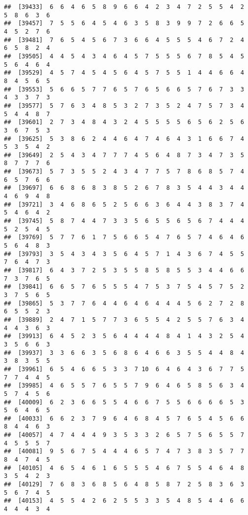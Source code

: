 \documentclass[
]{book}
\begin{document}
\begin{verbatim}
##  [39433]  6  6  4  6  5  8  9  6  6  4  2  3  4  7  2  5  5  4  2  5  8  6  3  6
##  [39457]  7  5  5  6  4  5  4  6  3  5  8  3  9  9  7  2  6  6  5  4  5  2  7  6
##  [39481]  7  6  5  4  5  6  7  3  6  6  4  5  5  5  4  6  7  2  4  6  5  8  2  4
##  [39505]  4  4  5  4  3  4  6  4  5  7  5  5  5  6  7  8  5  4  5  5  6  4  6  4
##  [39529]  4  5  7  4  5  4  5  6  4  5  7  5  5  1  4  4  6  6  4  8  4  5  6  5
##  [39553]  5  6  6  5  7  7  6  5  7  6  5  6  6  5  7  6  7  3  3  4  3  3  7  3
##  [39577]  5  7  6  3  4  8  5  3  2  7  3  5  2  4  7  5  7  3  4  5  4  4  8  7
##  [39601]  2  7  3  4  8  4  3  2  4  5  5  5  5  6  5  6  2  5  6  3  6  7  5  3
##  [39625]  5  3  8  6  2  4  4  6  4  7  4  6  4  3  1  6  6  7  4  5  3  5  4  2
##  [39649]  2  5  4  3  4  7  7  7  4  5  6  4  8  7  3  4  7  3  5  8  7  7  7  6
##  [39673]  5  7  3  5  5  2  4  3  4  7  7  5  7  8  6  8  5  7  4  6  5  7  6  6
##  [39697]  6  6  8  6  8  3  8  5  2  6  7  8  3  5  4  4  3  4  4  4  6  9  4  8
##  [39721]  3  4  6  8  6  5  2  5  6  6  3  6  4  4  3  8  3  7  4  5  4  6  4  2
##  [39745]  5  8  7  4  4  7  3  3  5  6  5  5  6  5  6  7  4  4  4  5  2  5  4  5
##  [39769]  5  7  7  6  1  7  5  6  6  5  4  7  6  5  7  4  6  4  6  5  6  4  8  3
##  [39793]  3  5  4  3  4  3  5  6  4  5  7  1  4  3  6  7  4  5  5  7  6  4  7  3
##  [39817]  6  4  3  7  2  5  3  5  5  8  5  8  5  5  3  4  4  6  6  7  3  7  6  5
##  [39841]  6  6  5  7  6  5  5  5  4  7  5  3  7  5  4  5  7  5  2  3  7  5  6  5
##  [39865]  5  3  7  7  6  4  4  6  4  6  4  4  4  5  6  2  7  2  8  6  5  5  2  3
##  [39889]  2  4  7  1  5  7  7  3  6  5  5  4  2  5  5  7  6  3  4  4  4  3  6  3
##  [39913]  6  4  5  2  3  5  6  4  4  4  4  8  4  1  4  3  2  5  4  3  5  6  6  3
##  [39937]  3  3  6  6  3  5  6  8  6  4  6  6  3  5  5  4  4  8  4  3  8  3  5  5
##  [39961]  6  5  4  6  6  5  3  3  7 10  6  4  6  4  3  6  7  7  5  7  7  4  4  5
##  [39985]  4  6  5  5  7  6  5  5  7  9  6  4  6  5  8  5  6  3  4  5  7  4  5  6
##  [40009]  6  2  3  6  6  5  5  4  6  6  7  5  5  6  6  6  6  5  3  5  6  4  6  5
##  [40033]  6  6  2  3  7  9  6  4  6  8  4  5  7  6  5  4  5  6  6  8  4  4  6  3
##  [40057]  4  7  4  4  4  9  3  5  3  3  2  6  5  7  5  6  5  5  7  4  5  5  5  7
##  [40081]  9  5  6  7  5  4  4  4  6  5  7  4  7  3  8  3  5  7  7  8  4  7  4  5
##  [40105]  4  6  5  4  6  1  6  5  5  5  4  6  7  5  5  4  6  4  8  3  5  4  2  3
##  [40129]  7  6  8  3  6  8  5  6  4  8  5  8  7  2  5  8  3  6  3  5  6  7  4  5
##  [40153]  4  5  5  4  2  6  2  5  5  3  3  5  4  8  5  4  4  6  6  4  4  4  3  4

\end{verbatim}
\end{document}
